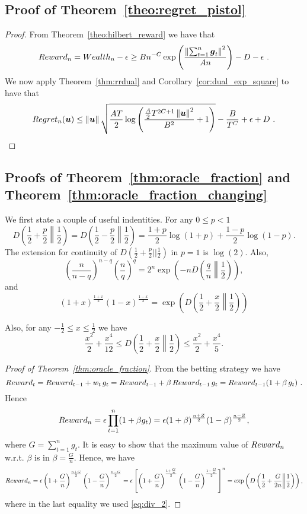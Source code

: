 \subsection{Proof of Theorem~\ref{theo:regret_pistol}}
\begin{proof}
From Theorem~\ref{theo:hilbert_reward} we have that
\[
Reward_n = Wealth_n - \epsilon  \geq B n^{-C} \exp\left(\frac{\left\|{\sum_{t=1}^n \boldsymbol{g}_t}\right\|^2}{A n}\right)-D - \epsilon~.
\]
We now apply Theorem~\ref{thm:rrdual} and Corollary~\ref{cor:dual_exp_square} to have that 
\[
Regret_n(\boldsymbol{u}) \leq \left\|{\boldsymbol{u}}\right\| \sqrt{\frac{A T}{2} \log \left(\frac{\frac{A}{2} T^{2C+1} \left\|{\boldsymbol{u}}\right\|^2}{B^2} +1 \right)} - \frac{B}{T^{C}} + \epsilon+D~. \qedhere
\]
\end{proof}


\subsection{Proofs of Theorem~\ref{thm:oracle_fraction} and Theorem~\ref{thm:oracle_fraction_changing}}

We first state a couple of useful indentities.
For any $ 0\leq p < 1$
\[
D\left(\frac{1}{2}+\frac{p}{2}\middle\|\frac{1}{2}\right) = D\left(\frac{1}{2}-\frac{p}{2}\middle\|\frac{1}{2}\right)= \frac{1+p}{2} \log(1+p) + \frac{1-p}{2} \log(1-p).
\]
The extension for continuity of $D(\frac{1}{2}+\frac{p}{2}||\frac{1}{2})$ in $p=1$ is $\log(2)$.
Also,
\[
\left(\frac{n}{n-q}\right)^{n-q} \left(\frac{n}{q}\right)^{q} = 2^n \exp\left(-n D\left(\frac{q}{n}\middle\|\frac{1}{2}\right)\right),
\]
and
\begin{equation}
\label{eq:div_2}
\left(1+x\right)^\frac{1+x}{2} \left(1-x\right)^\frac{1-x}{2}= \exp\left( D\left(\frac{1}{2}+\frac{x}{2}\middle\|\frac{1}{2}\right) \right)
\end{equation}

Also, for any $-\frac{1}{2} \leq x\leq \frac{1}{2}$ we have
\[
\frac{x^2}{2} +\frac{x^4}{12}\leq D\left(\frac{1}{2}+\frac{x}{2}\middle\|\frac{1}{2}\right) \leq \frac{x^2}{2} + \frac{x^4}{5}.
\]

\begin{proof}[Proof of Theorem~\ref{thm:oracle_fraction}]
From the betting strategy we have
\[
Reward_t=Reward_{t-1} + w_t \, g_t = Reward_{t-1} + \beta \, Reward_{t-1} \, g_t = Reward_{t-1} (1+\beta \, g_t)~.
\]
Hence
\[
Reward_n=\epsilon \prod_{t=1}^n (1+\beta g_t) = \epsilon (1+\beta)^\frac{n+Z}{2} (1-\beta)^\frac{n-Z}{2},
\]
where $G=\sum_{t=1}^n g_t$.
It is easy to show that the maximum value of $Reward_n$ w.r.t. $\beta$ is in $\beta=\frac{G}{n}$. 
Hence, we have
\[
Reward_n = \epsilon \left(1+\frac{G}{n}\right)^\frac{n+G}{2} \left(1-\frac{G}{n}\right)^\frac{n-G}{2} 
= \epsilon \left[\left(1+\frac{G}{n}\right)^\frac{1+\frac{G}{n}}{2} \left(1-\frac{G}{n}\right)^\frac{1-\frac{G}{n}}{2}\right]^n = \exp\left( D\left(\frac{1}{2}+\frac{G}{2n}\middle\|\frac{1}{2}\right) \right),
\]
where in the last equality we used \eqref{eq:div_2}.
\end{proof}

